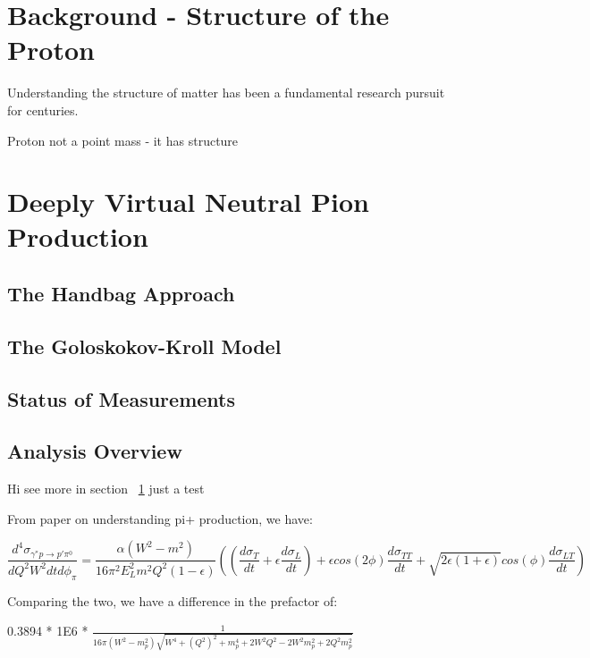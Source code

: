 \section{Background - Structure of the Proton}\label{ch1:sec1:background}
Understanding the structure of matter has been a fundamental research pursuit for centuries. 


Proton not a point mass - it has structure






\section{Deeply Virtual Neutral Pion Production}
    \subsection{The Handbag Approach}
    \subsection{The Goloskokov-Kroll Model}
    \subsection{Status of Measurements}
    \subsection{Analysis Overview}
    
Hi \cite{Bedlinskiy2014} see more in section ~\ref{ch1:sec1:background}
just a test

\iffalse


From paper on understanding pi+ production, we have:

 \begin{equation}\label{xsec}
     \frac{d^4\sigma_{\gamma^*p \rightarrow p'\pi^0}}{dQ^2W^2dtd\phi_{\pi}} =
     \frac{\alpha (W^2-m^2)}{16\pi^2 E^2_L m^2 Q^2 (1-\epsilon)}
     ((\frac{d\sigma_T}{dt}+\epsilon\frac{d\sigma_L}{dt})+
     \epsilon cos(2\phi) \frac{d\sigma_{TT}}{dt} + \sqrt{2\epsilon(1+\epsilon)}cos(\phi)\frac{d\sigma_{LT}}{dt})
\end{equation}

Comparing the two, we have a difference in the prefactor of:



0.3894 * 1E6 * $\frac{1}{16\pi(W^2-m_p^2)\sqrt{W^4 + (Q^2)^2+m_p^4+2W^2Q^2-2W^2m_p^2+2Q^2m_p^2}}$




